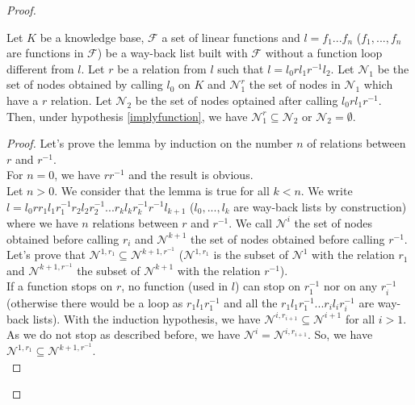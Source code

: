 \documentclass[10pt,a4paper,draft]{article}
\begin{document}
\begin{proof}
\begin{Lemma}
Let $K$ be a knowledge base, $\mathcal{F}$ a set of linear functions and $l = f_1 ... f_n$ ($f_1,...,f_n$ are functions in $\mathcal{F}$) be a way-back list built with $\mathcal{F}$ without a function loop different from $l$. Let $r$ be a relation from $l$ such that $l = l_0 r l_1 r^{-1} l_2$. Let $\mathcal{N}_1$ be the set of nodes obtained by calling $l_0$ on $K$ and $\mathcal{N}_1^r$ the set of nodes in $\mathcal{N}_1$ which have a $r$ relation. Let $\mathcal{N}_2$ be the set of nodes optained after calling $l_0 r l_1 r^{-1}$. Then, under hypothesis \ref{implyfunction}, we have $\mathcal{N}_1^r \subseteq \mathcal{N}_2$ or $\mathcal{N}_2 = \emptyset$.
\end{Lemma}

\begin{proof}
Let's prove the lemma by induction on the number $n$ of relations between $r$ and $r^{-1}$.\\
For $n = 0$, we have $r r^{-1}$ and the result is obvious. \\

Let $n > 0$. We consider that the lemma is true for all $k < n$. We write $l = l_0 r r_1 l_1 r_1^{-1} r_2 l_2 r_2^{-1} ... r_k l_k r_k^{-1} r^{-1} l_{k+1}$ ($l_0, ..., l_k$ are way-back lists by construction) where we have $n$ relations between $r$ and $r^{-1}$. We call $\mathcal{N}^i$ the set of nodes obtained before calling $r_i$ and $\mathcal{N}^{k+1}$ the set of nodes obtained before calling $r^{-1}$.\\

Let's prove that $\mathcal{N}^{1, r_1} \subseteq \mathcal{N}^{k+1, r^{-1}}$ ($\mathcal{N}^{1, r_1}$ is the subset of $\mathcal{N}^{1}$ with the relation $r_1$ and $\mathcal{N}^{k+1, r^{-1}}$ the subset of $\mathcal{N}^{k+1}$ with the relation $r^{-1}$).\\

If a function stops on $r$, no function (used in $l$) can stop on $r_1^{-1}$ nor on any $r_i^{-1}$ (otherwise there would be a loop as $r_1 l_1 r_1^{-1}$ and all the $r_1 l_1 r_1^{-1} ... r_i l_i r_i^{-1}$ are way-back lists). With the induction hypothesis, we have $\mathcal{N}^{i, r_{i+1}} \subseteq \mathcal{N}^{i+1}$ for all $i > 1$. As we do not stop as described before, we have $\mathcal{N}^i = \mathcal{N}^{i, r_{i+1}}$. So, we have $\mathcal{N}^{1, r_1} \subseteq \mathcal{N}^{k+1, r^{-1}}$.\\


\end{proof}
\end{proof}
\end{document}
